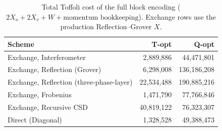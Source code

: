 \begin{table}[htbp]
  \centering
  \caption{Total Toffoli cost of the full block encoding ($2X_o + 2X_v + W + \text{momentum bookkeeping}$). Exchange rows use the production Reflection--Grover $X$.}
  \begin{tabular}{lrr}
    \toprule
    Scheme & T-opt & Q-opt \\
    \midrule
    Exchange, Interferometer & 2{,}889{,}886 & 44{,}471{,}801 \\
    Exchange, Reflection (Grover) & 6{,}298{,}008 & 136{,}186{,}208 \\
    Exchange, Reflection (three-phase-layer) & 22{,}534{,}488 & 190{,}885{,}216 \\
    Exchange, Frobenius & 1{,}471{,}790 & 77{,}766{,}846 \\
    Exchange, Recursive CSD & 40{,}819{,}122 & 76{,}323{,}307 \\
    Direct (Diagonal) & 1{,}328{,}528 & 49{,}388{,}473 \\
    \bottomrule
  \end{tabular}
\end{table}
